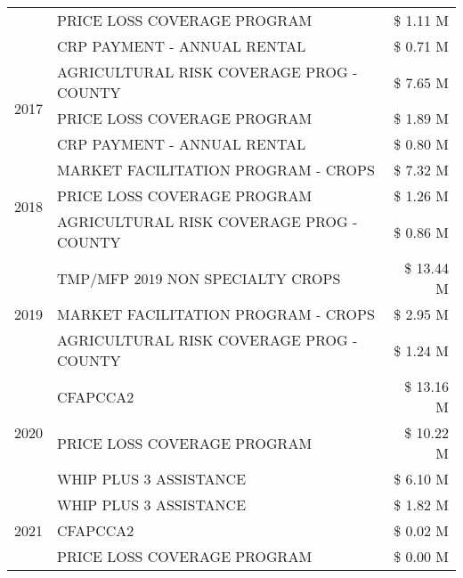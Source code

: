 \begin{tabular}{llr}
 & PRICE LOSS COVERAGE PROGRAM & \$ 1.11 M \\
 & CRP PAYMENT - ANNUAL RENTAL & \$ 0.71 M \\
\cline{1-3}
\multirow[t]{3}{*}{2017} & AGRICULTURAL RISK COVERAGE PROG - COUNTY & \$ 7.65 M \\
 & PRICE LOSS COVERAGE PROGRAM & \$ 1.89 M \\
 & CRP PAYMENT - ANNUAL RENTAL & \$ 0.80 M \\
\cline{1-3}
\multirow[t]{3}{*}{2018} & MARKET FACILITATION PROGRAM - CROPS & \$ 7.32 M \\
 & PRICE LOSS COVERAGE PROGRAM & \$ 1.26 M \\
 & AGRICULTURAL RISK COVERAGE PROG - COUNTY & \$ 0.86 M \\
\cline{1-3}
\multirow[t]{3}{*}{2019} & TMP/MFP 2019 NON SPECIALTY CROPS & \$ 13.44 M \\
 & MARKET FACILITATION PROGRAM - CROPS & \$ 2.95 M \\
 & AGRICULTURAL RISK COVERAGE PROG - COUNTY & \$ 1.24 M \\
\cline{1-3}
\multirow[t]{3}{*}{2020} & CFAPCCA2 & \$ 13.16 M \\
 & PRICE LOSS COVERAGE PROGRAM & \$ 10.22 M \\
 & WHIP PLUS 3 ASSISTANCE & \$ 6.10 M \\
\cline{1-3}
\multirow[t]{3}{*}{2021} & WHIP PLUS 3 ASSISTANCE & \$ 1.82 M \\
 & CFAPCCA2 & \$ 0.02 M \\
 & PRICE LOSS COVERAGE PROGRAM & \$ 0.00 M \\
\cline{1-3}
\bottomrule
\end{tabular}
